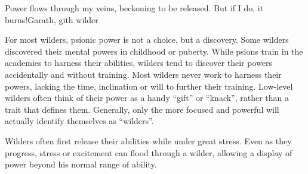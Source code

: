 {Power flows through my veins, beckoning to be released. But if I do, it burns!}{Garath, gith wilder}

For most wilders, psionic power is not a choice, but a discovery. Some wilders discovered their mental powers in childhood or puberty. While psions train in the academies to harness their abilities, wilders tend to discover their powers accidentally and without training. Most wilders never work to harness their powers, lacking the time, inclination or will to further their training. Low-level wilders often think of their power as a handy ``gift'' or ``knack'', rather than a trait that defines them. Generally, only the more focused and powerful will actually identify themselves as ``wilders''.

Wilders often first release their abilities while under great stress. Even as they progress, stress or excitement can flood through a wilder, allowing a display of power beyond his normal range of ability.


